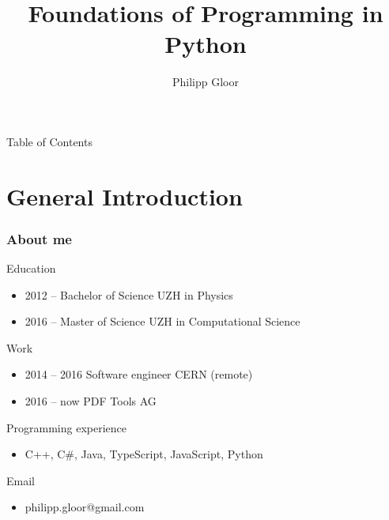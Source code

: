 \documentclass[10pt, a4paper]{beamer} %
\title %
{Foundations of Programming in Python}
\author %
{Philipp Gloor\inst{1}}
\institute
{
  \inst{1}%
  University of Zurich
}
\date{}
\begin{document}
\begin{frame}
\titlepage
\end{frame}

\begin{frame}{Table of Contents}
  \tableofcontents
\end{frame}

\section{General Introduction}
\begin{frame}
\frametitle{About me}

\begin{block}{Education}
  \begin{itemize}
    \item 2012 -- Bachelor of Science UZH in Physics
    \item 2016 -- Master of Science UZH in Computational Science
  \end{itemize}
\end{block}

\begin{block}{Work}
  \begin{itemize}
    \item 2014 -- 2016 Software engineer CERN (remote)
    \item 2016 -- now PDF Tools AG
  \end{itemize}
\end{block}

\begin{block}{Programming experience}
  \begin{itemize}
    \item[] C++, C\#, Java, TypeScript, JavaScript, Python
  \end{itemize}
\end{block}

\begin{block}{Email}
\begin{itemize}
  \item[] philipp.gloor@gmail.com
\end{itemize}
  
\end{block}
 
 
 
 
\end{frame}
\end{document}
